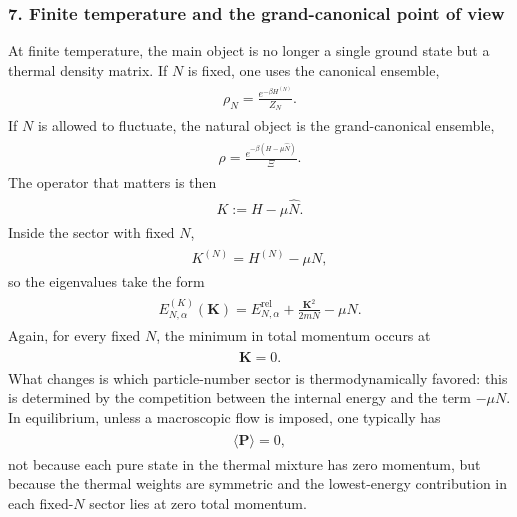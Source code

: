 \documentclass[../QFT_main.tex]{subfiles}
\begin{document}
\subsubsection*{7. Finite temperature and the grand-canonical point of view}
At finite temperature, the main object is no longer a single ground state but a thermal density matrix.
If $N$ is fixed, one uses the canonical ensemble,
{\small\begin{align}
\begin{aligned}
    \rho_N=\frac{e^{-\beta H^{(N)}}}{Z_N}.
\end{aligned}
\end{align}}
If $N$ is allowed to fluctuate, the natural object is the grand-canonical ensemble,
{\small\begin{align}
\begin{aligned}
    \rho=\frac{e^{-\beta(H-\mu \hat N)}}{\Xi}.
\end{aligned}
\end{align}}
The operator that matters is then
{\small\begin{align}
\begin{aligned}
    K:=H-\mu \hat N.
\end{aligned}
\end{align}}
Inside the sector with fixed $N$,
{\small\begin{align}
\begin{aligned}
    K^{(N)}=H^{(N)}-\mu N,
\end{aligned}
\end{align}}
so the eigenvalues take the form
{\small\begin{align}
\begin{aligned}
    E^{(K)}_{N,\alpha}(\mathbf{K})=E^{\text{rel}}_{N,\alpha}+\frac{\mathbf{K}^2}{2mN}-\mu N.
\end{aligned}
\end{align}}
Again, for every fixed $N$, the minimum in total momentum occurs at
{\small\begin{align}
\begin{aligned}
    \mathbf{K}=0.
\end{aligned}
\end{align}}
What changes is which particle-number sector is thermodynamically favored: this is determined by the competition between the internal energy and the term $-\mu N$.
In equilibrium, unless a macroscopic flow is imposed, one typically has
{\small\begin{align}
\begin{aligned}
    \langle \mathbf{P}\rangle=0,
\end{aligned}
\end{align}}
not because each pure state in the thermal mixture has zero momentum, but because the thermal weights are symmetric and the lowest-energy contribution in each fixed-$N$ sector lies at zero total momentum.
\end{document}
